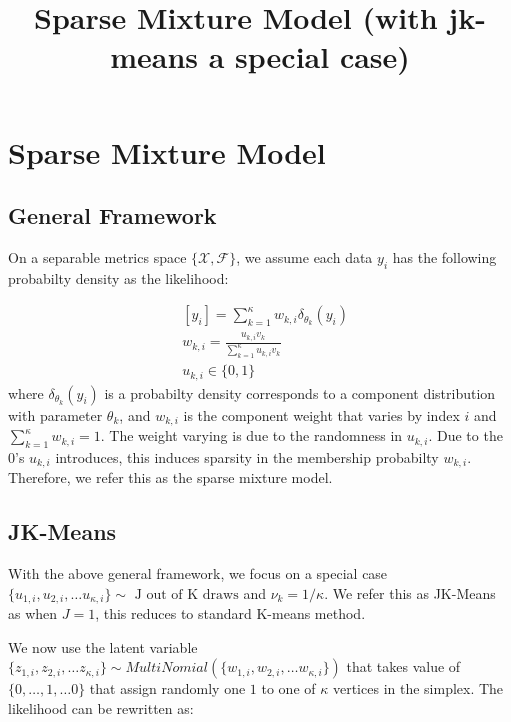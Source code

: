 \documentclass[12pt]{article}
\title
    {{Sparse Mixture Model (with jk-means a special case)}}
\date{}
\begin{document}
    
\maketitle


\section{Sparse Mixture Model}

\subsection{General Framework}

On a separable metrics space $\{\mathcal{X},\mathcal{F}\}$, we assume each data $y_i$ has the following probabilty density as the likelihood:

\begin{equation}
\begin{aligned}
& [ y_i ] = \sum_{k=1}^{\kappa} w_{k,i} \delta_{\theta_{k}}(y_i) \\
& w_{k,i} = \frac{ u_{k,i} v_{k} } { \sum_{k=1}^{\kappa}  u_{k,i} v_{k} }\\
& u_{k,i} \in \{0,1\}
\end{aligned}
\label{marginal_lik}
\end{equation}
where $\delta_{\theta_{k}}(y_i)$ is a probabilty density corresponds to a component distribution with parameter $\theta_{k}$, and $w_{k,i}$ is the component weight that varies by index $i$ and $\sum_{k=1}^{\kappa} w_{k,i} =1$. The weight varying is due to the randomness in $u_{k,i}$. Due to the $0$'s $u_{k,i}$ introduces, this induces sparsity in the membership probabilty $w_{k,i}$. Therefore, we refer this as the sparse mixture model.

\subsection{JK-Means}

With the above general framework, we focus on a special case $\{ u_{1,i},u_{2,i},\ldots u_{\kappa,i}\} \sim \text{ J out of K draws}$ and $\nu_k = 1/\kappa$. We refer this as JK-Means as when $J=1$, this reduces to standard K-means method.

We now use the latent variable $\{ z_{1,i},z_{2,i},\ldots z_{\kappa,i} \} \sim MultiNomial (\{ w_{1,i},w_{2,i},\ldots w_{\kappa,i}\} )$ that takes value of $\{0,\ldots,1,\ldots 0\}$ that assign randomly one $1$ to one of $\kappa$ vertices in the simplex. The likelihood can be rewritten as:
\end{document}
